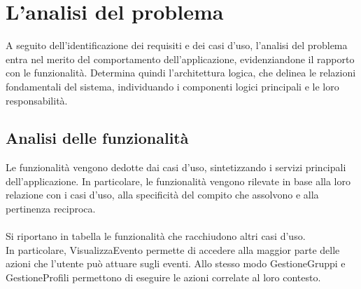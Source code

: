 \section{L’analisi del problema}

A seguito dell'identificazione dei requisiti e dei casi d'uso,
l'analisi del problema entra nel merito del comportamento dell'applicazione,
evidenziandone il rapporto con le funzionalità.
Determina quindi l'architettura logica, che delinea le relazioni fondamentali del sistema, 
individuando i componenti logici principali e le loro responsabilità.\\

\subsection{Analisi delle funzionalità}

Le funzionalità vengono dedotte dai casi d'uso, sintetizzando i servizi principali dell'applicazione.
In particolare, le funzionalità vengono rilevate in base alla loro relazione con i casi d'uso,
alla specificità del compito che assolvono e alla pertinenza reciproca.\\
\\
Si riportano in tabella le funzionalità che racchiudono altri casi d'uso.\\
In particolare, VisualizzaEvento permette di accedere alla maggior parte delle azioni 
che l'utente può attuare sugli eventi.
Allo stesso modo GestioneGruppi e GestioneProfili 
permettono di eseguire le azioni correlate al loro contesto.\\

